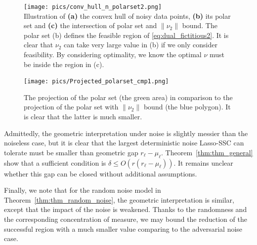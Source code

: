 \documentclass[twoside,11pt]{article}
\numberwithin{equation}{section}
\begin{document}
\begin{figure}
  \centering
    \texttt{[image: pics/conv\_hull\_n\_polarset2.png]}\\
  \caption{Illustration of \textbf{(a)} the convex hull of noisy data points, \textbf{(b)} its polar set and \textbf{(c)} the intersection of polar set and $\|\nu_2\|$ bound. The polar set (b) defines the feasible region of \eqref{eq:dual_fictitious2}. It is clear that $\nu_2$ can take very large value in (b) if we only consider feasibility. By considering optimality, we know the optimal $\nu$ must be inside the region in (c).} \label{fig.convex_hull_n_polar}
    \texttt{[image: pics/Projected\_polarset\_cmp1.png]}\\
  \caption{The projection of the polar set (the green area) in comparison to the projection of the polar set with $\|\nu_2\|$ bound (the blue polygon). It is clear that the latter is much smaller.}\label{fig.ProjPolar}
\end{figure}

Admittedly, the geometric interpretation under noise is slightly messier than the noiseless case, but it is clear that the largest deterministic noise Lasso-SSC can tolerate must be smaller than geometric gap $r_\ell-\mu_\ell$. Theorem~\ref{thm:thm_general} show that a sufficient condition is $\delta \leq O(r(r_\ell-\mu_\ell))$. It remains unclear whether this gap can be closed without additional assumptions.


Finally, we note that for the random noise model in Theorem~\ref{thm:thm_random_noise}, the geometric interpretation is similar, except that the impact of the noise is weakened. Thanks to the randomness and the corresponding concentration of measure, we may bound the reduction of the successful region with a much smaller value comparing to the adversarial noise case.

\end{document}
